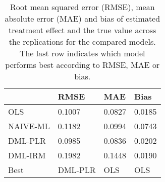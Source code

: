 \begin{table}[H]
\centering
\caption{Root mean squared error (RMSE), mean absolute error (MAE) and bias of estimated treatment effect and the true value across the replications for the compared models. The last row indicates which model performs best according to RMSE, MAE or bias.}
\label{Scenario2}
\begin{tabular}{L{3.3333333333333335cm}L{2.6666666666666665cm}R{2.0cm}R{2.6666666666666665cm}}
\toprule
 & RMSE & MAE & Bias \\
\midrule
OLS & 0.1007 & 0.0827 & 0.0185 \\
NAIVE-ML & 0.1182 & 0.0994 & 0.0743 \\
DML-PLR & 0.0985 & 0.0836 & 0.0202 \\
DML-IRM & 0.1982 & 0.1448 & 0.0190 \\
Best & DML-PLR & OLS & OLS \\
\bottomrule
\end{tabular}
\end{table}
